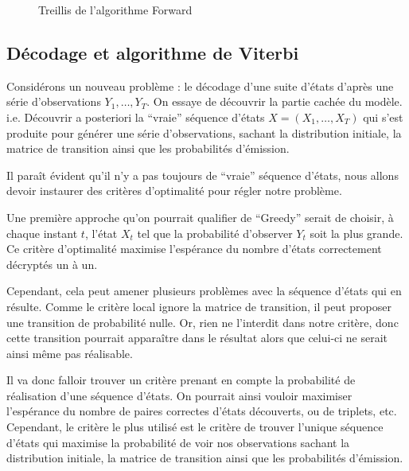 \documentclass[11pt]{article}
\begin{document}
\begin{figure}[H]
{
}
\vspace{0.35cm}
\caption{Treillis de l'algorithme Forward}
\label{fig:treillis-forward}
\end{figure}


\subsection{Décodage et algorithme de Viterbi}

Considérons un nouveau problème : le décodage d'une suite d'états d'après une série d'observations $Y_1,\dots,Y_T$.
On essaye de découvrir la partie cachée du modèle.\\
i.e. Découvrir a posteriori la ``vraie'' séquence d'états $X = (X_1, \dots, X_T)$ qui s'est produite pour générer une série d'observations, sachant la distribution initiale, la matrice de transition ainsi que les probabilités d'émission.

Il paraît évident qu'il n'y a pas toujours de ``vraie'' séquence d'états, nous allons devoir instaurer des critères d'optimalité pour régler notre problème.

Une première approche qu'on pourrait qualifier de ``Greedy'' serait de choisir, à chaque instant $t$, l'état $X_t$ tel que la probabilité d'observer $Y_t$ soit la plus grande.
Ce critère d'optimalité maximise l'espérance du nombre d'états correctement décryptés un à un.

Cependant, cela peut amener plusieurs problèmes avec la séquence d'états qui en résulte. Comme le critère local ignore la matrice de transition, il peut proposer une transition de probabilité nulle.
Or, rien ne l'interdit dans notre critère, donc cette transition pourrait apparaître dans le résultat alors que celui-ci ne serait ainsi même pas réalisable.

Il va donc falloir trouver un critère prenant en compte la probabilité de réalisation d'une séquence d'états. On pourrait ainsi vouloir maximiser l'espérance du nombre de paires correctes d'états découverts, ou de triplets, etc.
Cependant, le critère le plus utilisé est le critère de trouver l'unique séquence d'états qui maximise la probabilité de voir nos observations sachant la distribution initiale, la matrice de transition ainsi que les probabilités d'émission.
\end{document}
